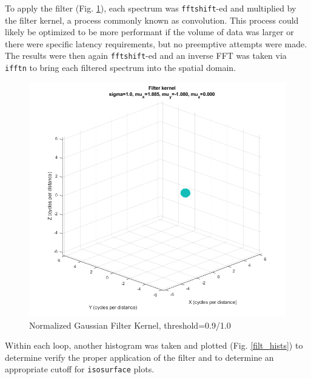 \documentclass[journal]{IEEEtran}
\def\code#1{\texttt{#1}}
\begin{document}
To apply the filter (Fig. \ref{kernel_isosurface}), each spectrum was \code{fftshift}-ed and multiplied by the filter kernel, a process commonly known as convolution. This process could likely be optimized to be more performant if the volume of data was larger or there were specific latency requirements, but no preemptive attempts were made. The results were then again \code{fftshift}-ed and an inverse FFT was taken via \code{ifftn} to bring each filtered spectrum into the spatial domain.

\begin{figure}
	\centerline{\includegraphics[width=\columnwidth]{filter_isosurface.png}}
	\caption{Normalized Gaussian Filter Kernel, threshold=0.9/1.0}\label{kernel_isosurface}
\end{figure}


Within each loop, another histogram was taken and plotted (Fig. \ref{filt_hists}) to determine verify the proper application of the filter and to determine an appropriate cutoff for \code{isosurface} plots.
\end{document}
